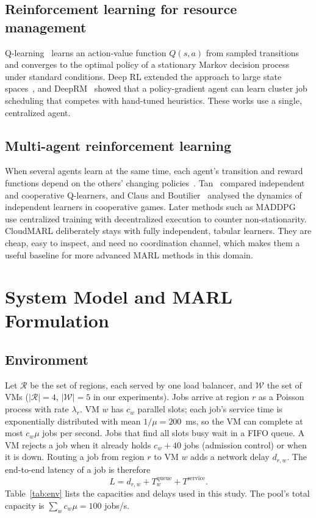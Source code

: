 \documentclass[conference]{IEEEtran}
\begin{document}
\subsection{Reinforcement learning for resource management}
Q-learning~\cite{watkins1992} learns an action-value function $Q(s,a)$ from sampled transitions and converges to the optimal policy of a stationary Markov decision process under standard conditions. Deep RL extended the approach to large state spaces~\cite{mnih2015dqn}, and DeepRM~\cite{mao2016deeprm} showed that a policy-gradient agent can learn cluster job scheduling that competes with hand-tuned heuristics. These works use a single, centralized agent.

\subsection{Multi-agent reinforcement learning}
When several agents learn at the same time, each agent's transition and reward functions depend on the others' changing policies~\cite{busoniu2008,hernandezleal2017}. Tan~\cite{tan1993} compared independent and cooperative Q-learners, and Claus and Boutilier~\cite{claus1998} analysed the dynamics of independent learners in cooperative games. Later methods such as MADDPG~\cite{lowe2017maddpg} use centralized training with decentralized execution to counter non-stationarity. CloudMARL deliberately stays with fully independent, tabular learners. They are cheap, easy to inspect, and need no coordination channel, which makes them a useful baseline for more advanced MARL methods in this domain.

\section{System Model and MARL Formulation}\label{sec:model}
\subsection{Environment}
Let $\mathcal{R}$ be the set of regions, each served by one load balancer, and $\mathcal{W}$ the set of VMs ($|\mathcal{R}|=4$, $|\mathcal{W}|=5$ in our experiments). Jobs arrive at region $r$ as a Poisson process with rate $\lambda_r$. VM $w$ has $c_w$ parallel slots; each job's service time is exponentially distributed with mean $1/\mu = 200$~ms, so the VM can complete at most $c_w\mu$ jobs per second. Jobs that find all slots busy wait in a FIFO queue. A VM rejects a job when it already holds $c_w + 40$ jobs (admission control) or when it is down. Routing a job from region $r$ to VM $w$ adds a network delay $d_{r,w}$. The end-to-end latency of a job is therefore
\begin{equation}
L = d_{r,w} + T^{\text{queue}}_w + T^{\text{service}}.
\end{equation}
Table~\ref{tab:env} lists the capacities and delays used in this study. The pool's total capacity is $\sum_w c_w\mu = 100$ jobs/s.
\end{document}

